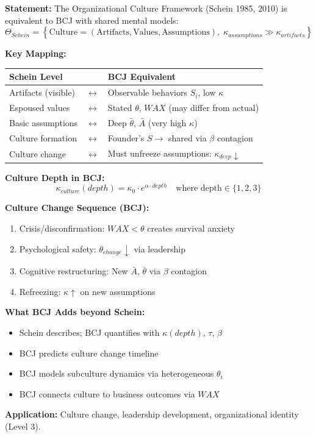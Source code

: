 \begin{tcolorbox}[colback=green!5!white, colframe=green!75!black,
    title=Theorem BCJ-T39: Schein Organizational Culture as Special Case]
\textbf{Statement:} The Organizational Culture Framework (Schein 1985, 2010) is equivalent to BCJ with shared mental models:
\begin{equation}
\Theta_{Schein} = \left\{\text{Culture} = (\text{Artifacts}, \text{Values}, \text{Assumptions}), \; \kappa_{assumptions} \gg \kappa_{artifacts}\right\}
\end{equation}

\textbf{Key Mapping:}
\begin{center}
\begin{tabular}{lcl}
\toprule
\textbf{Schein Level} & & \textbf{BCJ Equivalent} \\
\midrule
Artifacts (visible) & $\leftrightarrow$ & Observable behaviors $S_i$, low $\kappa$ \\
Espoused values & $\leftrightarrow$ & Stated $\theta$, $WAX$ (may differ from actual) \\
Basic assumptions & $\leftrightarrow$ & Deep $\bar{\theta}$, $\bar{A}$ (very high $\kappa$) \\
Culture formation & $\leftrightarrow$ & Founder's $S \to$ shared via $\beta$ contagion \\
Culture change & $\leftrightarrow$ & Must unfreeze assumptions: $\kappa_{deep} \downarrow$ \\
\bottomrule
\end{tabular}
\end{center}

\textbf{Culture Depth in BCJ:}
\begin{equation}
\kappa_{culture}(depth) = \kappa_0 \cdot e^{\alpha \cdot depth} \quad \text{where depth} \in \{1, 2, 3\}
\end{equation}

\textbf{Culture Change Sequence (BCJ):}
\begin{enumerate}[nosep]
\item Crisis/disconfirmation: $WAX < \theta$ creates survival anxiety
\item Psychological safety: $\theta_{change} \downarrow$ via leadership
\item Cognitive restructuring: New $\bar{A}$, $\bar{\theta}$ via $\beta$ contagion
\item Refreezing: $\kappa \uparrow$ on new assumptions
\end{enumerate}

\textbf{What BCJ Adds beyond Schein:}
\begin{itemize}[nosep]
\item Schein describes; BCJ quantifies with $\kappa(depth)$, $\tau$, $\beta$
\item BCJ predicts culture change timeline
\item BCJ models subculture dynamics via heterogeneous $\theta_i$
\item BCJ connects culture to business outcomes via $WAX$
\end{itemize}

\textbf{Application:} Culture change, leadership development, organizational identity (Level 3).
\end{tcolorbox}

